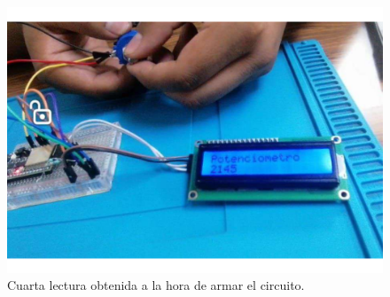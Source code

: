 \begin{figure}[H]
        \centering
        \includegraphics[trim = {50mm 0mm 0mm 0mm},clip,scale=0.3]{19/Img/evidenciaCambio4.pdf}
        \caption{Cuarta lectura obtenida a la hora de armar el circuito.}
        \label{fig:evidenciaCambio4}
    \end{figure}

    
    
